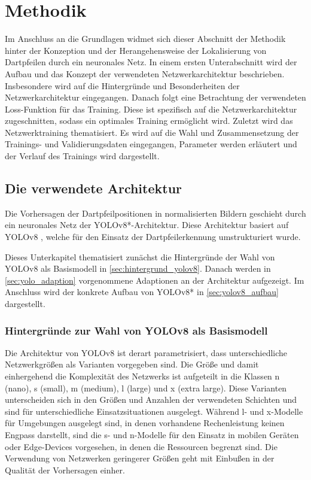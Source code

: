 
\section{Methodik}
\label{sec:ki:methodik}

Im Anschluss an die Grundlagen widmet sich dieser Abschnitt der Methodik hinter der Konzeption und der Herangehensweise der Lokalisierung von Dartpfeilen durch ein neuronales Netz. In einem ersten Unterabschnitt wird der Aufbau und das Konzept der verwendeten Netzwerkarchitektur beschrieben. Insbesondere wird auf die Hintergründe und Besonderheiten der Netzwerkarchitektur eingegangen. Danach folgt eine Betrachtung der verwendeten Loss-Funktion für das Training. Diese ist spezifisch auf die Netzwerkarchitektur zugeschnitten, sodass ein optimales Training ermöglicht wird. Zuletzt wird das Netzwerktraining thematisiert. Es wird auf die Wahl und Zusammensetzung der Trainings- und Validierungsdaten eingegangen, Parameter werden erläutert und der Verlauf des Trainings wird dargestellt.


\subsection{Die verwendete Architektur}
\label{sec:warum_yolov8}

Die Vorhersagen der Dartpfeilpositionen in normalisierten Bildern geschieht durch ein neuronales Netz der YOLOv8*-Architektur. Diese Architektur basiert auf YOLOv8 \cite{yolov8_paper}, welche für den Einsatz der Dartpfeilerkennung umstrukturiert wurde.

Dieses Unterkapitel thematisiert zunächst die Hintergründe der Wahl von YOLOv8 als Basismodell in \autoref{sec:hintergrund_yolov8}. Danach werden in \autoref{sec:yolo_adaption} vorgenommene Adaptionen an der Architektur aufgezeigt. Im Anschluss wird der konkrete Aufbau von YOLOv8* in \autoref{sec:yolov8_aufbau} dargestellt.

\subsubsection{Hintergründe zur Wahl von YOLOv8 als Basismodell}
\label{sec:hintergrund_yolov8}

Die Architektur von YOLOv8 ist derart parametrisiert, dass unterschiedliche Netzwerkgrößen als Varianten vorgegeben sind. Die Größe und damit einhergehend die Komplexität des Netzwerks ist aufgeteilt in die Klassen n (nano), s (small), m (medium), l (large) und x (extra large). Diese Varianten unterscheiden sich in den Größen und Anzahlen der verwendeten Schichten und sind für unterschiedliche Einsatzsituationen ausgelegt. Während l- und x-Modelle für Umgebungen ausgelegt sind, in denen vorhandene Rechenleistung keinen Engpass darstellt, sind die s- und n-Modelle für den Einsatz in mobilen Geräten oder Edge-Devices vorgesehen, in denen die Ressourcen begrenzt sind. Die Verwendung von Netzwerken geringerer Größen geht mit Einbußen in der Qualität der Vorhersagen einher.

